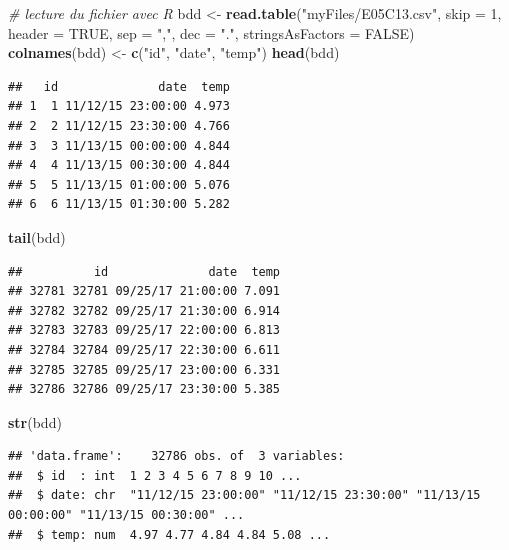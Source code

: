 \documentclass[
]{book}
\newenvironment{Shaded}{\begin{snugshade}}{\end{snugshade}}
\newcommand{\CommentTok}[1]{\textcolor[rgb]{0.56,0.35,0.01}{\textit{#1}}}
\newcommand{\DataTypeTok}[1]{\textcolor[rgb]{0.13,0.29,0.53}{#1}}
\newcommand{\DecValTok}[1]{\textcolor[rgb]{0.00,0.00,0.81}{#1}}
\newcommand{\KeywordTok}[1]{\textcolor[rgb]{0.13,0.29,0.53}{\textbf{#1}}}
\newcommand{\NormalTok}[1]{#1}
\newcommand{\OtherTok}[1]{\textcolor[rgb]{0.56,0.35,0.01}{#1}}
\newcommand{\StringTok}[1]{\textcolor[rgb]{0.31,0.60,0.02}{#1}}
\begin{document}
\begin{Shaded}
\begin{Highlighting}[]
\CommentTok{# lecture du fichier avec R}
\NormalTok{bdd <-}\StringTok{ }\KeywordTok{read.table}\NormalTok{(}\StringTok{"myFiles/E05C13.csv"}\NormalTok{, }\DataTypeTok{skip =} \DecValTok{1}\NormalTok{, }\DataTypeTok{header =} \OtherTok{TRUE}\NormalTok{, }
  \DataTypeTok{sep =} \StringTok{","}\NormalTok{, }\DataTypeTok{dec =} \StringTok{"."}\NormalTok{, }\DataTypeTok{stringsAsFactors =} \OtherTok{FALSE}\NormalTok{)}
\KeywordTok{colnames}\NormalTok{(bdd) <-}\StringTok{ }\KeywordTok{c}\NormalTok{(}\StringTok{"id"}\NormalTok{, }\StringTok{"date"}\NormalTok{, }\StringTok{"temp"}\NormalTok{)}
\KeywordTok{head}\NormalTok{(bdd)}
\end{Highlighting}
\end{Shaded}

\begin{verbatim}
##   id              date  temp
## 1  1 11/12/15 23:00:00 4.973
## 2  2 11/12/15 23:30:00 4.766
## 3  3 11/13/15 00:00:00 4.844
## 4  4 11/13/15 00:30:00 4.844
## 5  5 11/13/15 01:00:00 5.076
## 6  6 11/13/15 01:30:00 5.282
\end{verbatim}

\begin{Shaded}
\begin{Highlighting}[]
\KeywordTok{tail}\NormalTok{(bdd)}
\end{Highlighting}
\end{Shaded}

\begin{verbatim}
##          id              date  temp
## 32781 32781 09/25/17 21:00:00 7.091
## 32782 32782 09/25/17 21:30:00 6.914
## 32783 32783 09/25/17 22:00:00 6.813
## 32784 32784 09/25/17 22:30:00 6.611
## 32785 32785 09/25/17 23:00:00 6.331
## 32786 32786 09/25/17 23:30:00 5.385
\end{verbatim}

\begin{Shaded}
\begin{Highlighting}[]
\KeywordTok{str}\NormalTok{(bdd)}
\end{Highlighting}
\end{Shaded}

\begin{verbatim}
## 'data.frame':    32786 obs. of  3 variables:
##  $ id  : int  1 2 3 4 5 6 7 8 9 10 ...
##  $ date: chr  "11/12/15 23:00:00" "11/12/15 23:30:00" "11/13/15 00:00:00" "11/13/15 00:30:00" ...
##  $ temp: num  4.97 4.77 4.84 4.84 5.08 ...
\end{verbatim}
\end{document}
